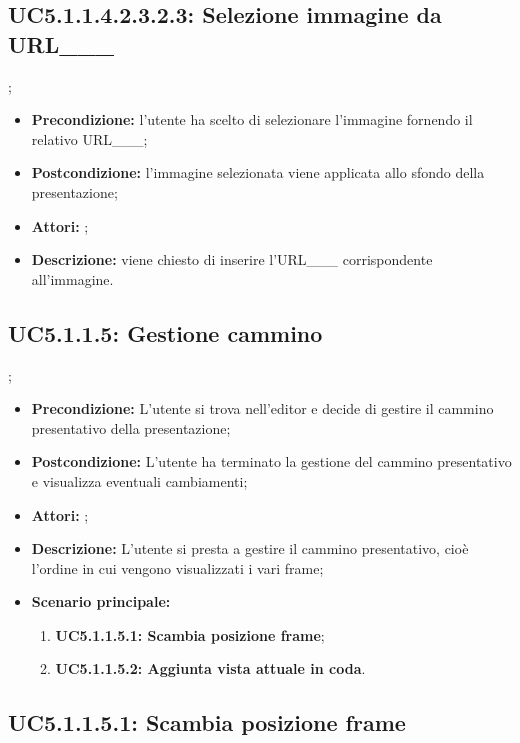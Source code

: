 \subsection{ UC5.1.1.4.2.3.2.3: Selezione immagine da URL___}
;
\begin{itemize}
	\item \textbf{Precondizione:} l’utente ha scelto di selezionare l’immagine fornendo il relativo URL___;
	\item \textbf{Postcondizione:} l’immagine selezionata viene applicata allo sfondo della presentazione;
	\item \textbf{Attori:} ;
	\item \textbf{Descrizione:} viene chiesto di inserire l’URL___ corrispondente all’immagine.
\end{itemize}
\subsection{ UC5.1.1.5: Gestione cammino}
;
\begin{itemize}
	\item \textbf{Precondizione:} L’utente si trova nell’editor e decide di gestire il cammino presentativo della presentazione;
	\item \textbf{Postcondizione:} L’utente ha terminato la gestione del cammino presentativo e visualizza eventuali cambiamenti;
	\item \textbf{Attori:} ;
	\item \textbf{Descrizione:} L’utente si presta a gestire il cammino presentativo, cioè l’ordine in cui vengono visualizzati i vari frame;
	\item \textbf{Scenario principale:}
	\begin{enumerate}
		\item \textbf{ UC5.1.1.5.1: Scambia posizione frame};
		\item \textbf{ UC5.1.1.5.2: Aggiunta vista attuale in coda}.
	\end{enumerate}
\end{itemize}
\subsection{ UC5.1.1.5.1: Scambia posizione frame}

